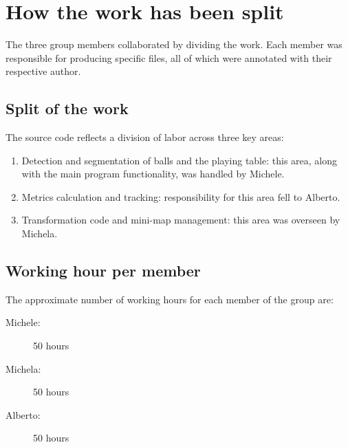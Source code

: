 \section{How the work has been split}
The three group members collaborated by dividing the work. Each member was responsible for producing specific files, all of which were annotated with their respective author.

\subsection{Split of the work}
The source code reflects a division of labor across three key areas:
\begin{enumerate}
	\item Detection and segmentation of balls and the playing table: this area, along with the main program functionality, was handled by Michele.
	\item Metrics calculation and tracking: responsibility for this area fell to Alberto.
	\item Transformation code and mini-map management: this area was overseen by Michela.
\end{enumerate}

\subsection{Working hour per member}
The approximate number of working hours for each member of the group are:
\begin{description}
	\item[Michele:] 50 hours
	\item[Michela:] 50 hours
	\item[Alberto:] 50 hours
\end{description}
